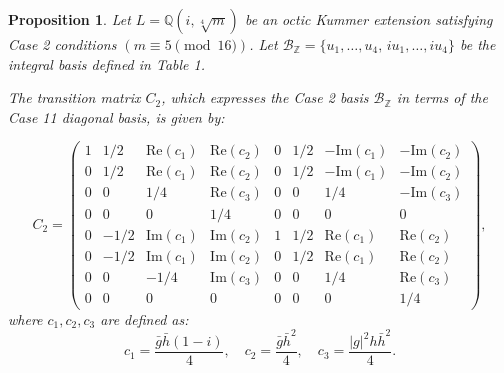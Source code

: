 \documentclass{amsart}
\theoremstyle{plain}
\newtheorem{proposition}[theorem]{Proposition}
\theoremstyle{definition}
\theoremstyle{remark}
\numberwithin{equation}{section}
\begin{document}
\begin{proposition}
Let $L = \mathbb{Q}(i, \sqrt[4]{m})$ be an octic Kummer extension satisfying Case 2 conditions $(m \equiv 5 \pmod{16})$. Let $\mathcal{B}_{\mathbb{Z}} = \{u_1, \dots, u_4, \, i u_1, \dots, i u_4\}$ be the integral basis defined in Table 1.

The transition matrix $C_{2}$, which expresses the Case 2 basis $\mathcal{B}_{\mathbb{Z}}$ in terms of the Case 11 diagonal basis, is given by:

\[
C_{2} = \begin{pmatrix}
1 & 1/2 & \text{Re}(c_1) & \text{Re}(c_2) & 0 & 1/2 & -\text{Im}(c_1) & -\text{Im}(c_2) \\
0 & 1/2 & \text{Re}(c_1) & \text{Re}(c_2) & 0 & 1/2 & -\text{Im}(c_1) & -\text{Im}(c_2) \\
0 & 0 & 1/4 & \text{Re}(c_3) & 0 & 0 & 1/4 & -\text{Im}(c_3) \\
0 & 0 & 0 & 1/4 & 0 & 0 & 0 & 0 \\
0 & -1/2 & \text{Im}(c_1) & \text{Im}(c_2) & 1 & 1/2 & \text{Re}(c_1) & \text{Re}(c_2) \\
0 & -1/2 & \text{Im}(c_1) & \text{Im}(c_2) & 0 & 1/2 & \text{Re}(c_1) & \text{Re}(c_2) \\
0 & 0 & -1/4 & \text{Im}(c_3) & 0 & 0 & 1/4 & \text{Re}(c_3) \\
0 & 0 & 0 & 0 & 0 & 0 & 0 & 1/4
\end{pmatrix},
\]
where $c_1,c_2,c_3$ are defined as:
\[
c_1 = \frac{\bar{g}\bar{h}(1-i)}{4}, \quad c_2 = \frac{\bar{g}\bar{h}^2}{4}, \quad c_3 = \frac{|g|^2 h \bar{h}^2}{4}.
\]


\end{proposition}
\end{document}
